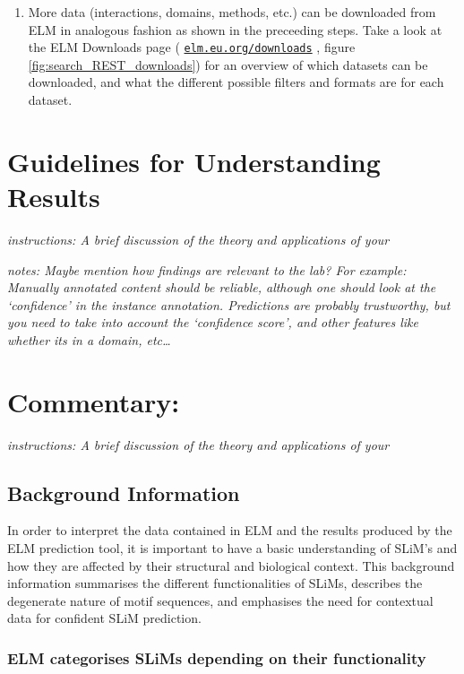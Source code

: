 \documentclass[12pt]{article}
\newcommand\rurl[1]{%
	\href{http://#1}{\nolinkurl{#1}}%
}
\begin{document}
\begin{enumerate}
\item More data (interactions, domains, methods, etc.) can be downloaded from
	ELM in analogous fashion as shown in the preceeding steps. Take a look
	at the ELM Downloads page (\rurl{elm.eu.org/downloads}, figure
	\ref{fig:search_REST_downloads}) for an overview of which datasets can
	be downloaded, and what the different possible filters and formats are
	for each dataset.  

\end{enumerate}

\clearpage

\section{Guidelines for Understanding Results}\label{guidelines-for-understanding-results}

\emph{instructions: A brief discussion of the theory and applications of
your}

\emph{notes: Maybe mention how findings are relevant to the lab? For
example: Manually annotated content should be reliable, although one
should look at the `confidence' in the instance annotation. Predictions
are probably trustworthy, but you need to take into account the
`confidence score', and other features like whether its in a domain,
etc\ldots{}}

\section*{Commentary:}\label{commentary}

\emph{instructions: A brief discussion of the theory and applications of
your}

\subsection*{Background Information}\label{background-information}

In order to interpret the data contained in ELM and the results produced by the
ELM prediction tool, it is important to have a basic understanding of SLiM's
and how they are affected by their structural and biological context. This 
background information summarises the different functionalities of SLiMs, 
describes the degenerate nature of motif sequences, and emphasises the need for 
contextual data for confident SLiM prediction.

\subsubsection*{ELM categorises SLiMs depending on their functionality}
\end{document}
